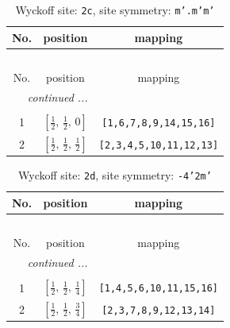 \documentclass[fleqn,8pt]{jsarticle}
\begin{document}
\renewcommand{\arraystretch}{1.2}
\begin{longtable}{ccc}
\caption{Wyckoff site: {\tt 2c}, site symmetry: {\tt m'.m'm'}}
 \\
 \hline \hline
No. & position & mapping \\ \hline \endfirsthead

\multicolumn{2}{l}{\tablename\ \thetable{}} \\
 \hline \hline
No. & position & mapping \\ \hline \endhead

 \hline \hline
\multicolumn{2}{r}{\footnotesize\it continued ...} \\ \endfoot

 \hline \hline
\multicolumn{2}{r}{} \\ \endlastfoot

1 & $\left[ \frac{1}{2},\, \frac{1}{2},\, 0 \right]$ & {\tt [1,6,7,8,9,14,15,16]} \\ \hline
2 & $\left[ \frac{1}{2},\, \frac{1}{2},\, \frac{1}{2} \right]$ & {\tt [2,3,4,5,10,11,12,13]} \\
\end{longtable}
\renewcommand{\arraystretch}{1.2}
\begin{longtable}{ccc}
\caption{Wyckoff site: {\tt 2d}, site symmetry: {\tt -4'2m'}}
 \\
 \hline \hline
No. & position & mapping \\ \hline \endfirsthead

\multicolumn{2}{l}{\tablename\ \thetable{}} \\
 \hline \hline
No. & position & mapping \\ \hline \endhead

 \hline \hline
\multicolumn{2}{r}{\footnotesize\it continued ...} \\ \endfoot

 \hline \hline
\multicolumn{2}{r}{} \\ \endlastfoot

1 & $\left[ \frac{1}{2},\, \frac{1}{2},\, \frac{1}{4} \right]$ & {\tt [1,4,5,6,10,11,15,16]} \\ \hline
2 & $\left[ \frac{1}{2},\, \frac{1}{2},\, \frac{3}{4} \right]$ & {\tt [2,3,7,8,9,12,13,14]} \\
\end{longtable}
\renewcommand{\arraystretch}{1.2}
\end{document}
